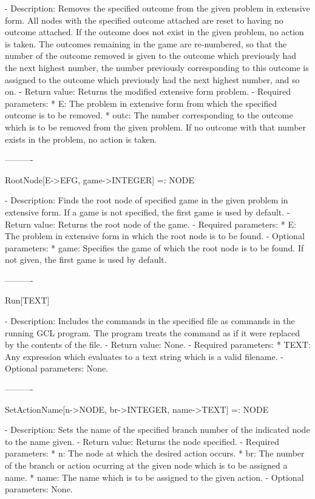    -	Description:  Removes the specified outcome from the given problem in
	extensive form.  All nodes with the specified outcome attached are 
	reset to having no outcome attached.  If the outcome does not exist in
	the given problem, no action is taken.  The outcomes remaining in the 
	game are re-numbered, so that the number of the outcome removed is 
	given to the outcome which previously had the next highest number, the
	number previously corresponding to this outcome is assigned to the
	outcome which previously had the next highest number, and so on.  
   -	Return value:  Returns the modified extensive form problem.
   -	Required parameters:
	  *  E:  The problem in extensive form from which the specified outcome
		is to be removed.
	  *  outc:  The number corresponding to the outcome which is to be 
		removed from the given problem.  If no outcome with that number
		exists in the problem, no action is taken.

----------

RootNode[E->EFG, {game->INTEGER}] =: NODE

   -	Description:  Finds the root node of specified game in the given 
	problem in extensive form.  If a game is not specified, the first game 
	is used by default.
   -	Return value:  Returns the root node of the game.
   -	Required parameters:
	  *  E:  The problem in extensive form in which the root node is to be
		found.
   -	Optional parameters:
	  *  game:  Specifies the game of which the root node is to be found.
		If not given, the first game is used by default.

----------

Run[TEXT]

   -	Description:  Includes the commands in the specified file as commands 
	in the running GCL program.  The program treats the command as if it 
	were replaced by the contents of the file.
   -	Return value:  None.
   -	Required parameters:
	  *  TEXT:  Any expression which evaluates to a text string which is a
		valid filename.
   -	Optional parameters:  None.

----------

SetActionName[n->NODE, br->INTEGER, name->TEXT] =: NODE

   -	Description:  Sets the name of the specified branch number of the 
	indicated node to the name given.
   -	Return value:  Returns the node specified.
   -	Required parameters:
	  *  n:  The node at which the desired action occurs.
	  *  br:  The number of the branch or action ocurring at the given node
		which is to be assigned a name.
	  *  name:  The name which is to be assigned to the given action.
   -	Optional parameters:  None.

